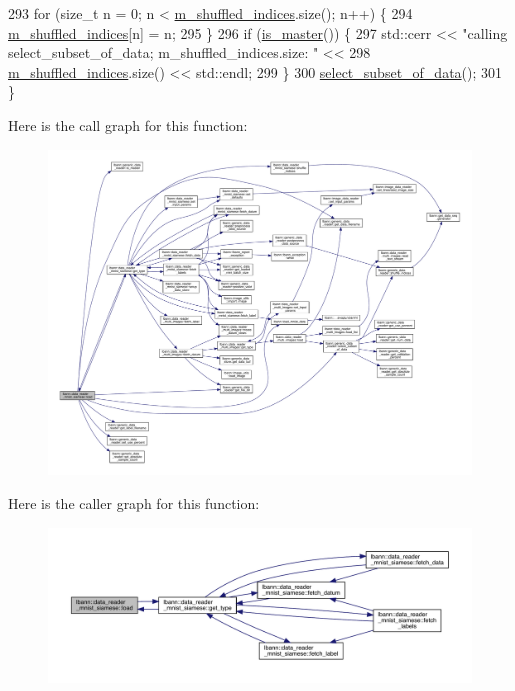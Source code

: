 \begin{DoxyCode}
293   \textcolor{keywordflow}{for} (\textcolor{keywordtype}{size\_t} n = 0; n < \hyperlink{classlbann_1_1generic__data__reader_aaab6aeff67ffff1c689336851fec2c57}{m\_shuffled\_indices}.size(); n++) \{
294     \hyperlink{classlbann_1_1generic__data__reader_aaab6aeff67ffff1c689336851fec2c57}{m\_shuffled\_indices}[n] = n;
295   \}
296   \textcolor{keywordflow}{if} (\hyperlink{classlbann_1_1generic__data__reader_ae82c40eebc05e2f0c1198afcc7a7f009}{is\_master}()) \{
297     std::cerr << \textcolor{stringliteral}{"calling select\_subset\_of\_data; m\_shuffled\_indices.size: "} <<
298       \hyperlink{classlbann_1_1generic__data__reader_aaab6aeff67ffff1c689336851fec2c57}{m\_shuffled\_indices}.size() << std::endl;
299   \}
300   \hyperlink{classlbann_1_1generic__data__reader_aa28fdeeb6af492540f507e49adff5d6c}{select\_subset\_of\_data}();
301 \}
\end{DoxyCode}
Here is the call graph for this function\+:\nopagebreak
\begin{figure}[H]
\begin{center}
\leavevmode
\includegraphics[width=350pt]{classlbann_1_1data__reader__mnist__siamese_a2c60a89c5815fa24b34d4febfecfc3db_cgraph}
\end{center}
\end{figure}
Here is the caller graph for this function\+:\nopagebreak
\begin{figure}[H]
\begin{center}
\leavevmode
\includegraphics[width=350pt]{classlbann_1_1data__reader__mnist__siamese_a2c60a89c5815fa24b34d4febfecfc3db_icgraph}
\end{center}
\end{figure}
